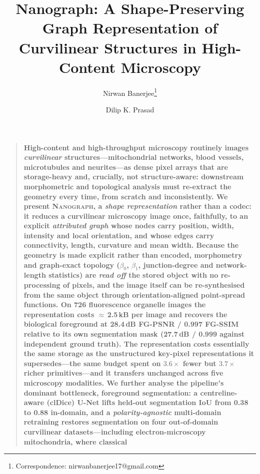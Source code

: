 \documentclass[10pt,a4paper]{article}
\newcommand{\method}{\textnormal{\textsc{Nanograph}}\xspace}
\renewenvironment{abstract}
  {\begin{quote}\small\bfseries\noindent}
  {\end{quote}}
\begin{document}
\title{Nanograph: A Shape-Preserving Graph Representation of Curvilinear
Structures in High-Content Microscopy}

\author[1]{Nirwan Banerjee\thanks{Correspondence: nirwanbanerjee17@gmail.com}}
\author[1]{Dilip K. Prasad}
\date{}

\maketitle
\linenumbers

\begin{abstract}
High-content and high-throughput microscopy routinely images
\emph{curvilinear} structures---mitochondrial networks, blood vessels,
microtubules and neurites---as dense pixel arrays that are storage-heavy and,
crucially, not structure-aware: downstream morphometric and topological
analysis must re-extract the geometry every time, from scratch and
inconsistently. We present \method, a \emph{shape representation} rather than
a codec: it reduces a curvilinear microscopy image once, faithfully, to an
explicit \emph{attributed graph} whose nodes carry position, width, intensity
and local orientation, and whose edges carry connectivity, length, curvature
and mean width. Because the geometry is made explicit rather than encoded,
morphometry and graph-exact topology ($\beta_0$, $\beta_1$, junction-degree
and network-length statistics) are \emph{read off} the stored object with no
re-processing of pixels, and the image itself can be re-synthesised from the
same object through orientation-aligned point-spread functions. On 726
fluorescence organelle images the representation costs $\approx$\,2.5\,kB per
image and recovers the biological foreground at 28.4\,dB FG-PSNR / 0.997
FG-SSIM relative to its own segmentation mask (27.7\,dB / 0.999 against
independent ground truth). The representation costs essentially the same
storage as the unstructured key-pixel representations it supersedes---the
same budget spent on $3.6\times$ fewer but $3.7\times$ richer
primitives---and it transfers unchanged across five microscopy modalities.
We further analyse the pipeline's dominant bottleneck, foreground
segmentation: a centreline-aware (clDice) U-Net lifts held-out segmentation
IoU from 0.38 to 0.88 in-domain, and a \emph{polarity-agnostic} multi-domain
retraining restores segmentation on four out-of-domain curvilinear
datasets---including electron-microscopy mitochondria, where classical

\end{abstract}
\end{document}
